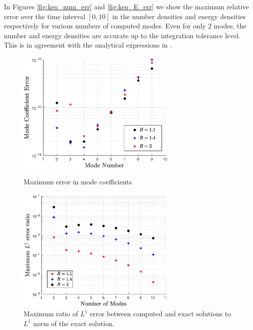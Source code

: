 In Figures \ref{fig:keq_num_err} and  \ref{fig:keq_E_err} we show the maximum relative error over the time interval $[0,10]$ in the number densities and energy densities respectively for various numbers of computed modes. Even for only $2$ modes, the number and energy densities are accurate up to the integration tolerance level.  This is in agreement with the analytical expressions in .



\begin{figure}[ht]
\begin{minipage}[t]{0.5\linewidth}
\centerline{\includegraphics[height=6cm]{06-appendix/SpectralMethodBoltzmann/Figures/keq_b_err.eps}}
\caption{Maximum error in mode coefficients.}\label{fig:keq_b_err}
 \end{minipage}
 \hspace{0.5cm}
 \begin{minipage}[t]{0.5\linewidth}
\centerline{\includegraphics[height=6.1cm]{06-appendix/SpectralMethodBoltzmann/Figures/keq_L1_err.eps}}
\caption{Maximum ratio of $L^1$ error between computed and exact solutions to $L^1$ norm of the exact solution.}\label{fig:keq_L1_err}
\end{minipage}
\end{figure}


